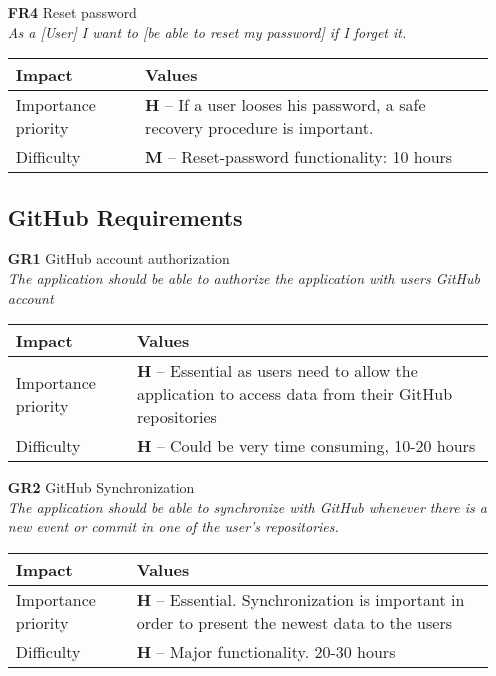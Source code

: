 \begin{itemize}
    \item[\textbf{FR4}] Reset password \\
        \textit{\small{As a [User] I want to [be able to reset my password] if I forget it.}}

        \begin{tabular}{| l | p{7cm} |}
            \hline
            \rowcolor[gray]{0.8}
            \textbf{Impact} & \textbf{Values} \\
            \hline
            Importance priority & \textbf{H} -- If a user looses his password, a safe recovery procedure is important.\\
            Difficulty & \textbf{M} -- Reset-password functionality: 10 hours \\
            \hline
        \end{tabular}
    \vspace{0.5cm}

\subsection{GitHub Requirements}
    \item[\textbf{GR1}] GitHub account authorization\\
        \textit{\small{The application should be able to authorize the application with users GitHub account}}

        \begin{tabular}{| l | p{7cm} |}
            \hline
            \rowcolor[gray]{0.8}
            \textbf{Impact} & \textbf{Values} \\
            \hline
            Importance priority & \textbf{H} -- Essential as users need to allow the application to access data from their GitHub repositories\\
            Difficulty & \textbf{H} -- Could be very time consuming, 10-20 hours \\
            \hline
        \end{tabular}
    \vspace{0.5cm}

    \item[\textbf{GR2}] GitHub Synchronization\\
        \textit{\small{The application should be able to synchronize with GitHub whenever there is a new event or commit in one of the user's repositories.}}

        \begin{tabular}{| l | p{7cm} |}
            \hline
            \rowcolor[gray]{0.8}
            \textbf{Impact} & \textbf{Values} \\
            \hline
            Importance priority & \textbf{H} -- Essential. Synchronization is important in order to present the newest data to the users\\
            Difficulty & \textbf{H} -- Major functionality. 20-30 hours\\
            \hline
        \end{tabular}
    \vspace{0.5cm}


\end{itemize}
